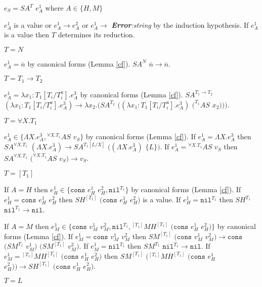 \begin{case}
$e_{S}=SA^{T}$ $e_{A}^{1}$ where $A\in\lbrace H,M\rbrace$

$e_{A}^{1}$ is a value or $e_{A}^{1}\rightarrow e_{A}^{2}$ or $e_{A}^{1}\rightarrow$ \emph{\textbf{Error}:\;string} by the induction hypothesis.  If $e_{A}^{1}$ is a value then $T$ determines its reduction.
\begin{subcase}
$T=N$

$e_{A}^{1}=\overline{n}$ by canonical forms (Lemma \ref{cf}).  $SA^{N}$ $\overline{n}\rightarrow\overline{n}$.
\end{subcase}
\begin{subcase}
$T=T_{1}\rightarrow T_{2}$

$e_{A}^{1}=\lambda x_{1}:T_{1}[T_{i}/T_{i}^{a}].e_{A}^{3}$ by canonical forms (Lemma \ref{cf}).  $SA^{T_{1}\rightarrow T_{2}}$ $(\lambda x_{1}:T_{1}[T_{i}/T_{i}^{a}].e_{A}^{3})\rightarrow\lambda x_{2}.(SA^{T_{2}}$ $((\lambda x_{1}:T_{1}[T_{i}/T_{i}^{a}].e_{A}^{3})$ $(^{T_{1}}AS$ $x_{2})))$.
\end{subcase}
\begin{subcase}
$T=\forall X.T_{1}$

$e_{A}^{1}\in\lbrace\Lambda X.e_{A}^{3},{^{\forall X.T_{1}}A}S$ $v_{S}\rbrace$ by canonical forms (Lemma \ref{cf}).  If $e_{A}^{1}=\Lambda X.e_{A}^{3}$ then $SA^{\forall X.T_{1}}$ $(\Lambda X.e_{A}^{3})\rightarrow SA^{T_{1}[L/X]}$ $((\Lambda X.e_{A}^{3})$ $\lbrace L\rbrace)$.  If $e_{A}^{1}={^{\forall X.T_{1}}A}S$ $v_{S}$ then $SA^{\forall X.T_{1}}$ $(^{\forall X.T_{1}}AS$ $v_{S})\rightarrow v_{S}$.
\end{subcase}
\begin{subcase}
$T=[T_{1}]$

If $A=H$ then $e_{H}^{1}\in\lbrace\mathtt{cons}$ $e_{H}^{1}$ $e_{H}^{2},\mathtt{nil}^{T_{1}}\rbrace$ by canonical forms (Lemma \ref{cf}).  If $e_{H}^{1}=\mathtt{cons}$ $e_{H}^{1}$ $e_{H}^{2}$ then $SH^{[T_{1}]}$ $(\mathtt{cons}$ $e_{H}^{1}$ $e_{H}^{2})$ is a value.  If $e_{H}^{1}=\mathtt{nil}^{T_{1}}$ then $SH^{T_{1}}$ $\mathtt{nil}^{T_{1}}\rightarrow\mathtt{nil}$.

If $A=M$ then $e_{M}^{1}\in\lbrace\mathtt{cons}$ $v_{M}^{1}$ $v_{M}^{2},\mathtt{nil}^{T_{1}},{^{[T_{1}]}M}H^{[T_{1}]}$ $(\mathtt{cons}$ $e_{H}^{1}$ $e_{H}^{2})\rbrace$ by canonical forms (Lemma \ref{cf}).  If $e_{M}^{1}=\mathtt{cons}$ $v_{M}^{1}$ $v_{M}^{2}$ then $SM^{[T_{1}]}$ $(\mathtt{cons}$ $v_{M}^{1}$ $v_{M}^{2})\rightarrow\mathtt{cons}$ $(SM^{T_{1}}$ $v_{M}^{1})$ $(SM^{[T_{1}]}$ $v_{M}^{2})$.  If $e_{M}^{1}=\mathtt{nil}^{T_{1}}$ then $SM^{T_{1}}$ $\mathtt{nil}^{T_{1}}\rightarrow\mathtt{nil}$.  If $e_{M}^{1}={^{[T_{1}]}M}H^{[T_{1}]}$ $(\mathtt{cons}$ $e_{H}^{1}$ $e_{H}^{2})$ then $SM^{[T_{1}]}$ $({^{[T_{1}]}M}H^{[T_{1}]}$ $(\mathtt{cons}$ $e_{H}^{1}$ $e_{H}^{2}))\rightarrow SH^{[T_{1}]}$ $(\mathtt{cons}$ $e_{H}^{1}$ $e_{H}^{2})$.
\end{subcase}
\begin{subcase}
$T=L$


\end{subcase}
\end{case}
